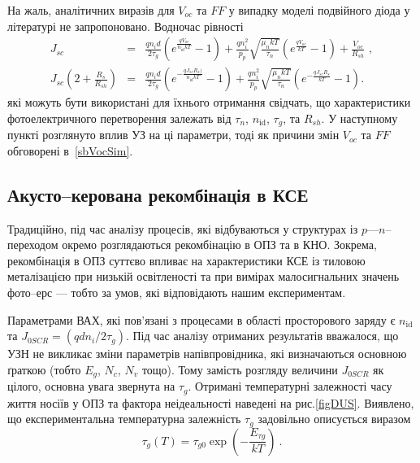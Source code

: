 На жаль, аналітичних виразів для $V_{oc}$ та $F\!F$ у випадку моделі подвійного діода у літературі не запропоновано.
Водночас рівності
\begin{eqnarray}
\label{eqSSCVoc}
 \nonumber J_{sc}&=&\frac{qn_id}{2\tau_{g}}\left(e^{\frac{qV_{oc}}{n_\mathrm{id}kT}}-1\right)
+\frac{qn_i^2}{p_p}\sqrt{\frac{\mu_nkT}{\tau_n}}\left(e^{\frac{qV_{oc}}{kT}}-1\right)+\frac{V_{oc}}{R_{sh}}\,\,,\\
 \nonumber J_{sc}\left(2+\frac{R_s}{R_{sh}}\right)&=&\frac{qn_id}{2\tau_{g}}\left(e^{-\frac{qJ_{sc}R_s)}{n_\mathrm{id}kT}}-1\right)
+\frac{qn_i^2}{p_p}\sqrt{\frac{\mu_nkT}{\tau_n}}\left(e^{-\frac{qJ_{sc}R_s}{kT}}-1\right).
\end{eqnarray}
які можуть бути використані для їхнього отримання свідчать,
що характеристики фотоелектричного перетворення
залежать від $\tau_n$, $n_\mathrm{id}$, $\tau_g$, та $R_{sh}$.
У наступному пункті розглянуто вплив УЗ на ці параметри,
тоді як причини змін $V_{oc}$ та  $F\!F$ обговорені в~\ref{sbVocSim}.


\subsection{Акусто--керована рекомбінація в КСЕ\label{sbQNR}}

Традиційно, під час аналізу процесів, які відбуваються у структурах із $p$---$n$--переходом окремо розглядаються рекомбінацію в ОПЗ та в КНО.
Зокрема, рекомбінація в ОПЗ суттєво впливає на характеристики КСЕ із тиловою металізацією при низькій
освітленості та при вимірах малосигнальних значень фото--ерс \cite{Sach:UPJ2016} --- тобто за умов, які відповідають нашим експериментам.


Параметрами ВАХ, які пов'язані з процесами в області просторового заряду є $n_{\mathrm{id}}$ та $J_{0SCR}=(qdn_i/2\tau_{g})$.
Під час аналізу отриманих результатів вважалося, що УЗН не
викликає зміни параметрів напівпровідника, які визначаються основною ґраткою (тобто  $E_g$, $N_c$, $N_v$ тощо).
Тому замість розгляду величини $J_{0SCR}$ як цілого, основна увага звернута на $\tau_{g}$.
Отримані температурні залежності часу життя носіїв у ОПЗ та фактора неідеальності наведені на рис.\ref{figDUS}.
Виявлено, що експериментальна температурна залежність $\tau_{g}$ задовільно описується виразом
\begin{equation}
\label{eq_TAUgT}
    \tau_{g}(T)=\tau_{g0}\exp\left(-\frac{E_{\tau g}}{kT}\right)\:.
\end{equation}

